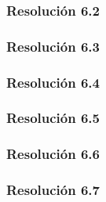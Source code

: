 \subsubsection{Resolución 6.2}


\subsubsection{Resolución 6.3}


\subsubsection{Resolución 6.4}


\subsubsection{Resolución 6.5}


\subsubsection{Resolución 6.6}


\subsubsection{Resolución 6.7}



